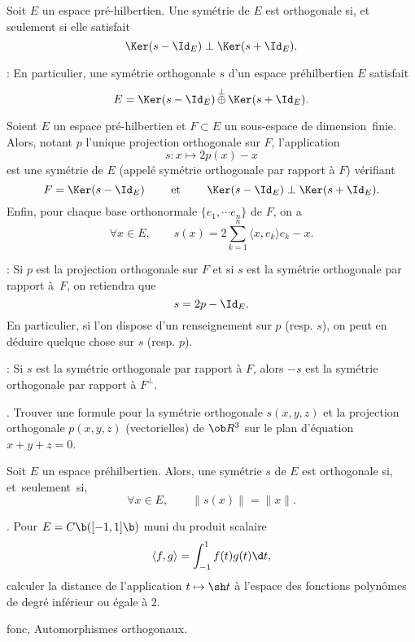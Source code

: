 \Definition []  Soit $E$ un espace pr\'e-hilbertien. Une sym\'etrie de $E$ est orthogonale si, et seulement si elle satisfait 
$$
\Ker(s-\Id_E)\perp\Ker(s+\Id_E).
$$

\Remarque : En particulier, une sym\'etrie orthogonale $s$ d'un espace pr\'ehilbertien $E$ satisfait 
$$
E=\Ker(s-\Id_E)\mathop{\oplus}\limits^\perp\Ker(s+\Id_E).
$$


\Propriete []  Soient $E$ un espace pr\'e-hilbertien et $F\subset E$ un sous-espace de dimension~finie.
Alors, notant $p$ l'unique projection orthogonale sur $F$, l'application 
$$
s:x\mapsto 2p(x)-x
$$ 
est une sym\'etrie de $E$ (appel\'e sym\'etrie orthogonale par rapport \`a $F$) v\'erifiant 
$$
F=\Ker(s-\Id_E)\qquad\mbox{ et }\qquad \Ker(s-\Id_E)\perp\Ker(s+\Id_E).
$$ 
Enfin, pour chaque base orthonormale $\{e_1,\cdots e_n\}$ de $F$, on a 
$$
\forall x\in E, \qquad s(x)=2\sum_{k=1}^n\langle x,e_k\rangle e_k-x.
$$

 : Si $p$ est la projection orthogonale sur $F$ et si $s$ est la sym\'etrie orthogonale par rapport \`a~$F$, on retiendra que 
$$
s=2p-\Id_E.
$$
En particulier, si l'on dispose d'un renseignement sur $p$ (resp. $s$), on peut en d\'eduire quelque chose sur $s$ (resp. $p$). 
\bigskip

 : Si $s$ est la sym\'etrie orthogonale par rapport \`a $F$, alors $-s$ est la sym\'etrie orthogonale par rapport \`a $F^\perp$. 
\bigskip

\Exercice. Trouver une formule pour la sym\'etrie orthogonale $s(x,y,z)$ et la projection orthogonale $p(x,y,z)$ (vectorielles) de $\ob R^3$ sur le plan d'\'equation $x+y+z=0$. 
\bigskip 

\Propriete []  Soit $E$ un espace pr\'ehilbertien. Alors, une sym\'etrie $s$ de $E$ est orthogonale si, et~seulement~si,
$$
\forall x\in E, \qquad \|s(x)\|=\|x\|. 
$$

\Exercice. Pour $E=\sc C\b([-1,1]\b)$ muni du produit scalaire $$
\langle f,g\rangle=\int_{-1}^1f(t)g(t)\d t,
$$ 
calculer la distance de l'application $t\mapsto \sh t$ \`a l'espace des fonctions polyn\^omes de degr\'e inf\'erieur ou \'egale \`a $2$. 
\bigskip








\pagetitretrue

\Chapter fonc, Automorphismes orthogonaux. 
\bigskip


